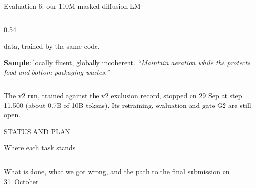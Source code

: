 \documentclass[aspectratio=169,10pt,t]{beamer}
\newcommand{\src}[1]{\par\vfill{\color{muted}\fontsize{6.5}{8}\selectfont #1}\par\vspace{1.2mm}}
\newcommand{\sectionslide}[3]{%
  \begin{frame}[c,plain]
    \hspace*{4mm}\begin{minipage}{0.86\linewidth}\raggedright
      {\color{accent}\fontsize{10}{12}\selectfont\firasemibold #1}\par\vspace{2mm}
      {\fontsize{22}{26}\selectfont\firasemibold #2}\par\vspace{3mm}
      {\color{accent}\rule{14mm}{1.6pt}}\par\vspace{3mm}
      {\color{ink2}\normalsize #3}
    \end{minipage}
  \end{frame}}
\begin{document}
\begin{frame}{Evaluation 6: our 110M masked diffusion LM}
\begin{columns}[T,onlytextwidth]
\begin{column}{0.54\textwidth}
{      data, trained by the same code.\par}
      \vspace{1.5mm}
      {\footnotesize\raggedright\textbf{Sample}: locally fluent, globally incoherent.
      {\color{ink2}\itshape ``Maintain aeration while the protects food and bottom
      packaging wastes.''}\par}
    \end{column}
  \end{columns}
  \src{The v2 run, trained against the v2 exclusion record, stopped on 29 Sep at step 11,500
  (about 0.7B of 10B tokens). Its retraining, evaluation and gate G2 are still open.}
\end{frame}

\sectionslide{STATUS AND PLAN}{Where each task stands}{%
  What is done, what we got wrong, and the path to the final submission on 31~October}
\end{document}
